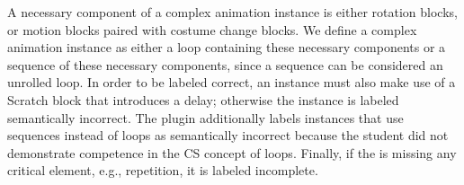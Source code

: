 A necessary component of a complex animation instance is either rotation
blocks, or motion blocks paired with costume change blocks. We define a complex
animation instance as either a loop containing these necessary components or a
sequence of these necessary components, since a sequence can be considered an
unrolled loop. In order to be labeled correct, an instance must also make use
of a Scratch block that introduces a delay; otherwise the instance is labeled
semantically incorrect. The plugin additionally labels instances that use
sequences instead of loops as semantically incorrect because the student did
not demonstrate competence in the CS concept of loops. Finally, if the
\sprogram{} is missing any critical element, e.g., repetition, it is labeled
incomplete.
